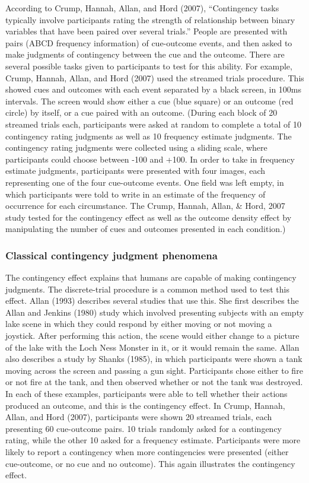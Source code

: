 \documentclass[
  english,
  man,floatsintext]{apa6}
\begin{document}
According to Crump, Hannah, Allan, and Hord (2007), ``Contingency tasks typically involve participants rating the strength of relationship between binary variables that have been paired over several trials.'' People are presented with pairs (ABCD frequency information) of cue-outcome events, and then asked to make judgments of contingency between the cue and the outcome. There are several possible tasks given to participants to test for this ability. For example, Crump, Hannah, Allan, and Hord (2007) used the streamed trials procedure. This showed cues and outcomes with each event separated by a black screen, in 100ms intervals. The screen would show either a cue (blue square) or an outcome (red circle) by itself, or a cue paired with an outcome. (During each block of 20 streamed trials each, participants were asked at random to complete a total of 10 contingency rating judgments as well as 10 frequency estimate judgments. The contingency rating judgments were collected using a sliding scale, where participants could choose between -100 and +100. In order to take in frequency estimate judgments, participants were presented with four images, each representing one of the four cue-outcome events. One field was left empty, in which participants were told to write in an estimate of the frequency of occurrence for each circumstance. The Crump, Hannah, Allan, \& Hord, 2007 study tested for the contingency effect as well as the outcome density effect by manipulating the number of cues and outcomes presented in each condition.)

\hypertarget{classical-contingency-judgment-phenomena}{%
\subsubsection{Classical contingency judgment phenomena}\label{classical-contingency-judgment-phenomena}}

The contingency effect explains that humans are capable of making contingency judgments. The discrete-trial procedure is a common method used to test this effect. Allan (1993) describes several studies that use this. She first describes the Allan and Jenkins (1980) study which involved presenting subjects with an empty lake scene in which they could respond by either moving or not moving a joystick. After performing this action, the scene would either change to a picture of the lake with the Loch Ness Monster in it, or it would remain the same. Allan also describes a study by Shanks (1985), in which participants were shown a tank moving across the screen and passing a gun sight. Participants chose either to fire or not fire at the tank, and then observed whether or not the tank was destroyed. In each of these examples, participants were able to tell whether their actions produced an outcome, and this is the contingency effect. In Crump, Hannah, Allan, and Hord (2007), participants were shown 20 streamed trials, each presenting 60 cue-outcome pairs. 10 trials randomly asked for a contingency rating, while the other 10 asked for a frequency estimate. Participants were more likely to report a contingency when more contingencies were presented (either cue-outcome, or no cue and no outcome). This again illustrates the contingency effect.
\end{document}
